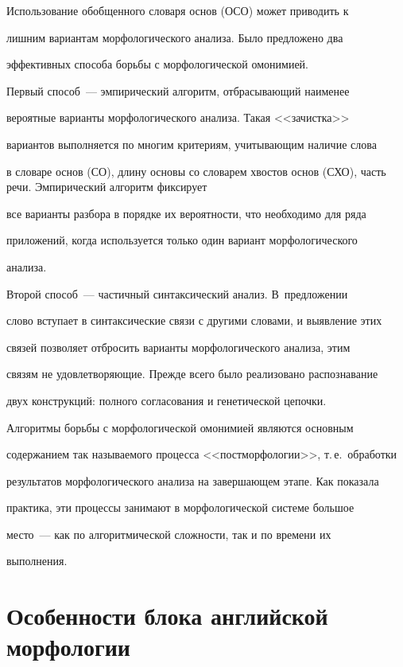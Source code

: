     Использование обобщенного словаря основ (ОСО) может приводить к

лишним вариантам морфологического анализа. Было предложено два

эффективных способа борьбы с морфологической омонимией.



    Первый способ~--- эмпирический алгоритм, отбрасывающий наименее

вероятные варианты морфологического анализа. Такая <<зачистка>>

вариантов выполняется по многим критериям, учитывающим наличие слова

в словаре основ (СО), длину основы со словарем хвос\-тов основ (СХО), часть речи. Эмпирический алгоритм фиксирует

все варианты разбора в порядке их вероятности, что необходимо для ряда

приложений, когда используется только один вариант морфологического

анализа.



    Второй способ~--- частичный синтаксический анализ. В~предложении

слово вступает в синтаксические связи с другими словами, и выявление этих

связей позволяет отбросить варианты морфологического анализа, этим

связям не удовлетворяющие. Прежде всего было реализовано распознавание

двух конструкций: полного согласования и генетической цепочки.



    Алгоритмы борьбы с морфологической омонимией являются основным

содержанием так называемого процесса <<постморфологии>>, т.\,е.\ обработки

результатов морфологического анализа на завершающем этапе. Как показала

практика, эти процессы занимают в морфологической системе большое

место~--- как по алгоритмической сложности, так и по времени их

выполнения.



\section{Особенности блока английской морфологии}




